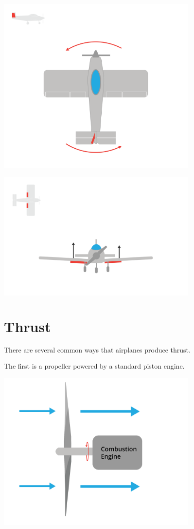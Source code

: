 \includegraphics[width=0.75\textwidth]{rudder.png}

\includegraphics[width=0.75\textwidth]{flaps.png}




\section{Thrust}

There are several common ways that airplanes produce thrust.

The first is a propeller powered by a standard piston engine.

\includegraphics[width=0.75\textwidth]{propeller.png}

